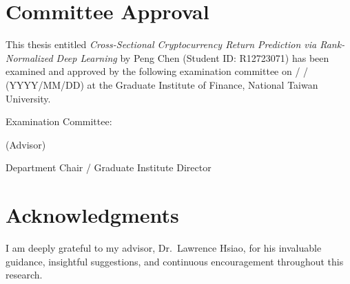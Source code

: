 \documentclass[12pt, a4paper, oneside]{book}
\begin{document}
\chapter*{Committee Approval}
\thispagestyle{plain}

\vspace{1cm}
\noindent This thesis entitled \textit{Cross-Sectional Cryptocurrency Return Prediction via
Rank-Normalized Deep Learning} by Peng Chen (Student ID: R12723071) has been
examined and approved by the following examination committee on
\underline{\hspace{3em}} / \underline{\hspace{3em}} / \underline{\hspace{3em}} (YYYY/MM/DD)
at the Graduate Institute of Finance, National Taiwan University.

\vspace{3cm}
\noindent Examination Committee:

\vspace{1.5cm}
\hspace{4cm}\underline{\hspace{8cm}} (Advisor)

\vspace{1.2cm}
\hspace{4cm}\underline{\hspace{8cm}}

\vspace{1.2cm}
\hspace{4cm}\underline{\hspace{8cm}}

\vspace{1.2cm}
\hspace{4cm}\underline{\hspace{8cm}}

\vspace{2cm}
\noindent Department Chair / Graduate Institute Director\underline{\hspace{5cm}}

\chapter*{Acknowledgments}
\thispagestyle{plain}

\noindent I am deeply grateful to my advisor, Dr.\ Lawrence Hsiao, for his invaluable
guidance, insightful suggestions, and continuous encouragement throughout this research.
\end{document}
